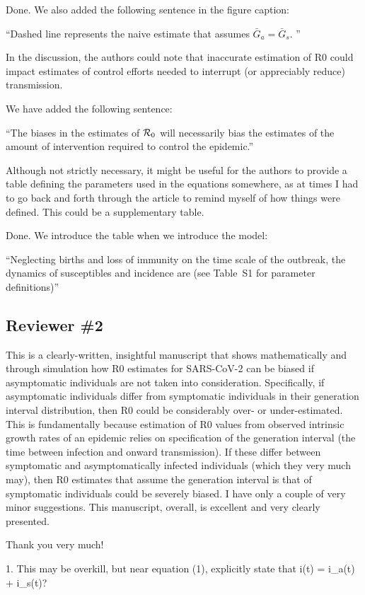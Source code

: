 \documentclass[12pt]{article}
\newcommand{\rev}{\subsection*}
\newcommand{\revtext}{\textsf}
\begin{document}
Done. We also added the following sentence in the figure caption:

``Dashed line represents the naive estimate that assumes $\bar G_a = \bar G_s$. ''

\revtext{In the discussion, the authors could note that inaccurate estimation of R0 could impact estimates of control efforts needed to interrupt (or appreciably reduce) transmission.}

We have added the following sentence:

``The biases in the estimates of ${\cal{R}}_0$ will necessarily bias the estimates of the amount of intervention required to control the epidemic.''

\revtext{Although not strictly necessary, it might be useful for the authors to provide a table defining the parameters used in the equations somewhere, as at times I had to go back and forth through the article to remind myself of how things were defined.  This could be a supplementary table.}

Done. We introduce the table when we introduce the model:

``Neglecting births and loss of immunity on the time scale of the outbreak, the dynamics of susceptibles and incidence are (see Table~S1 for parameter definitions)''

\rev{Reviewer \#2} 

\revtext{This is a clearly-written, insightful manuscript that shows mathematically and through simulation how R0 estimates for SARS-CoV-2 can be biased if asymptomatic individuals are not taken into consideration. Specifically, if asymptomatic individuals differ from symptomatic individuals in their generation interval distribution, then R0 could be considerably over- or under-estimated. This is fundamentally because estimation of R0 values from observed intrinsic growth rates of an epidemic relies on specification of the generation interval (the time between infection and onward transmission). If these differ between symptomatic and asymptomatically infected individuals (which they very much may), then R0 estimates that assume the generation interval is that of symptomatic individuals could be severely biased.
I have only a couple of very minor suggestions. This manuscript, overall, is excellent and very clearly presented.}

Thank you very much!

\revtext{1. This may be overkill, but near equation (1), explicitly state that i(t) = i_a(t) + i_s(t)?}
\end{document}
